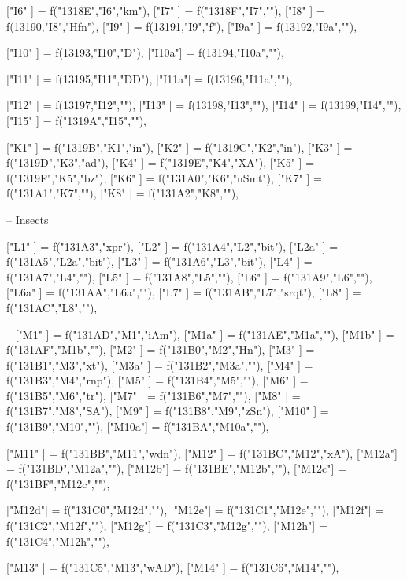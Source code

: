 {["I6"  ]       = f("1318E","I6","km"),
["I7"  ]       = f("1318F","I7",""),
["I8"  ]       = f(13190,"I8","Hfn"),
["I9"  ]       = f(13191,"I9","f"),
["I9a" ]       = f(13192,"I9a",""),

["I10" ]       = f(13193,"I10","D"),
["I10a"]       = f(13194,"I10a",""),

["I11" ]       = f(13195,"I11","DD"),
["I11a"]       = f(13196,"I11a",""),

["I12" ]       = f(13197,"I12",""),
["I13" ]       = f(13198,"I13",""),
["I14" ]       = f(13199,"I14",""),
["I15" ]       = f("1319A","I15",""),

["K1"  ]       = f("1319B","K1","in"),
["K2"  ]       = f("1319C","K2","in"),
["K3"  ]       = f("1319D","K3","ad"),
["K4"  ]       = f("1319E","K4","XA"),
["K5"  ]       = f("1319F","K5","bz"),
["K6"  ]       = f("131A0","K6","nSmt"),
["K7"  ]       = f("131A1","K7",""),
["K8"  ]       = f("131A2","K8",""),

-- Insects

["L1"  ]       = f("131A3","xpr"),
["L2"  ]       = f("131A4","L2","bit"),
["L2a" ]       = f("131A5","L2a","bit"),
["L3"  ]       = f("131A6","L3","bit"),
["L4"  ]       = f("131A7","L4",""),
["L5"  ]       = f("131A8","L5",""),
["L6"  ]       = f("131A9","L6",""),
["L6a" ]       = f("131AA","L6a",""),
["L7"  ]       = f("131AB","L7","srqt"),
["L8"  ]       = f("131AC","L8",""),

--
["M1"  ]       = f("131AD","M1","iAm"),
["M1a" ]       = f("131AE","M1a",""),
["M1b" ]       = f("131AF","M1b",""),
["M2"  ]       = f("131B0","M2","Hn"),
["M3"  ]       = f("131B1","M3","xt"),
["M3a" ]       = f("131B2","M3a",""),
["M4"  ]       = f("131B3","M4","rnp"),
["M5"  ]       = f("131B4","M5",""),
["M6"  ]       = f("131B5","M6","tr"),
["M7"  ]       = f("131B6","M7",""),
["M8"  ]       = f("131B7","M8","SA"),
["M9"  ]       = f("131B8","M9","zSn"),
["M10" ]       = f("131B9","M10",""),
["M10a"]       = f("131BA","M10a",""),

["M11" ]       = f("131BB","M11","wdn"),
["M12" ]       = f("131BC","M12","xA"),
["M12a"]       = f("131BD","M12a",""),
["M12b"]       = f("131BE","M12b",""),
["M12c"]       = f("131BF","M12c",""),

["M12d"]       = f("131C0","M12d",""),
["M12e"]       = f("131C1","M12e",""),
["M12f"]       = f("131C2","M12f",""),
["M12g"]       = f("131C3","M12g",""),
["M12h"]       = f("131C4","M12h",""),

["M13" ]       = f("131C5","M13","wAD"),
["M14" ]       = f("131C6","M14",""),

}
